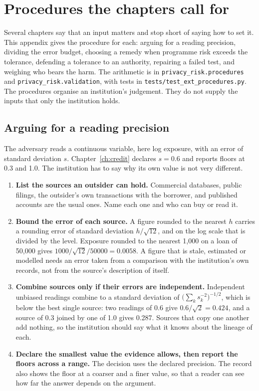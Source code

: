 \chapter{Procedures the chapters call for}\label{app:procedures}

Several chapters say that an input matters and stop short of saying how to set it. This
appendix gives the procedure for each: arguing for a reading precision, dividing the error
budget, choosing a remedy when programme risk exceeds the tolerance, defending a tolerance
to an authority, repairing a failed test, and weighing who bears the harm. The arithmetic is
in \texttt{privacy\_risk.procedures} and \texttt{privacy\_risk.validation}, with tests in
\texttt{tests/test\_ext\_procedures.py}. The procedures organise an institution's judgement.
They do not supply the inputs that only the institution holds.

\section{Arguing for a reading precision}\label{app:b-precision}

The adversary reads a continuous variable, here log exposure, with an error of standard
deviation $s$. Chapter~\ref{ch:credit} declares $s = 0.6$ and reports floors at 0.3 and 1.0.
The institution has to say why its own value is not very different.

\begin{enumerate}
\item \textbf{List the sources an outsider can hold.} Commercial databases, public filings,
the outsider's own transactions with the borrower, and published accounts are the usual
ones. Name each one and who can buy or read it.
\item \textbf{Bound the error of each source.} A figure rounded to the nearest $h$ carries a
rounding error of standard deviation $h/\sqrt{12}$, and on the log scale that is divided by
the level. Exposure rounded to the nearest 1,000 on a loan of 50,000 gives
$1000/\sqrt{12}/50000 = 0.0058$. A figure that is stale, estimated or modelled needs an
error taken from a comparison with the institution's own records, not from the source's
description of itself.
\item \textbf{Combine sources only if their errors are independent.} Independent unbiased
readings combine to a standard deviation of $\bigl(\sum_k s_k^{-2}\bigr)^{-1/2}$, which is
below the best single source: two readings of 0.6 give $0.6/\sqrt{2} = 0.424$, and a source
of 0.3 joined by one of 1.0 gives 0.287. Sources that copy one another add nothing, so the
institution should say what it knows about the lineage of each.
\item \textbf{Declare the smallest value the evidence allows, then report the floors across a
range.} The decision uses the declared precision. The record also shows the floor at a
coarser and a finer value, so that a reader can see how far the answer depends on the
argument.
\end{enumerate}

